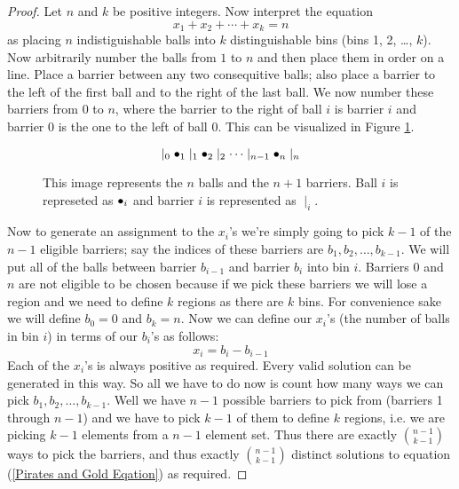         \begin{proof}
            Let $n$ and $k$ be positive integers. Now interpret the equation
            \begin{equation}
                \label{Pirates and Gold Eqation}
                x_1 + x_2 + \cdots + x_k = n
            \end{equation}
            as placing $n$ indistiguishable balls into $k$ distinguishable bins
            (bins 1, 2, \dots, $k$). Now arbitrarily number the balls from $1$ to $n$ and
            then place them in order on a line. Place a barrier between any two
            consequitive balls; also place a barrier to the left of the first ball and
            to the right of the last ball. We now number these barriers from $0$ to $n$, where
            the barrier to the right of ball $i$ is barrier $i$ and barrier 0 is the
            one to the left of ball $0$. This can be visualized in Figure \ref{Balls in a Row}.
            \begin{figure}[H]
                \centering
                \[
                    \mid_{0} \bullet_1 \mid_1 \bullet_2 \mid_2 \cdots \mid_{n - 1} \bullet_n \mid_{n}
                \]
                \caption{This image represents the $n$ balls and the $n + 1$ barriers. Ball $i$
                         is represeted as $\bullet_i$ and barrier $i$ is represented as $\mid_i$.}
                \label{Balls in a Row}
            \end{figure}
            Now to generate an assignment to the $x_i$'s we're simply going to pick $k - 1$
            of the $n - 1$ eligible barriers; say the indices of these barriers are
            $b_1, b_2, \dots, b_{k - 1}$. We will put all of the balls between barrier
            $b_{i - 1}$ and barrier $b_i$ into bin $i$. Barriers 0 and $n$ are not eligible to be
            chosen because if we pick these barriers we will lose a region and we need to define
            $k$ regions as there are $k$ bins. For convenience sake we will define $b_0 = 0$ and
            $b_k = n$. Now we can define our $x_i$'s (the number of balls in bin $i$) in terms
            of our $b_i$'s as follows:
            \begin{equation}
                x_i = b_i - b_{i - 1} 
            \end{equation}
            Each of the $x_i$'s is always positive as required. Every valid solution can be
            generated in this way. So all we have to do now is count how many ways we can pick
            $b_1, b_2, \dots, b_{k - 1}$. Well we have $n - 1$ possible barriers to pick from
            (barriers 1 through $n - 1$) and we have to pick $k - 1$ of them to define $k$ regions,
            i.e. we are picking $k - 1$ elements from a $n - 1$ element set. Thus there are exactly
            $\binom{n - 1}{k - 1}$ ways to pick the barriers, and thus exactly $\binom{n - 1}{k - 1}$
            distinct solutions to equation (\ref{Pirates and Gold Eqation}) as required. \QED
        \end{proof}
